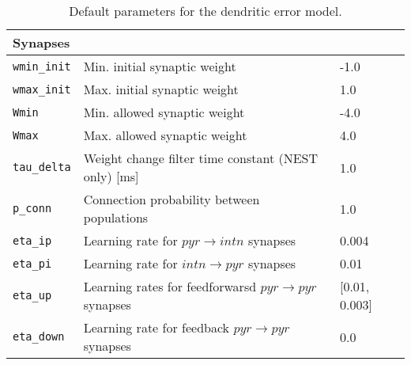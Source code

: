 \begin{table}
\begin{center}
\begin{tabular}{p{}p{}p{}}
      \\
      \textbf{Synapses}
      \\\hline
      \texttt{wmin\_init}          & Min. initial synaptic weight                                                & -1.0
      \\
      \texttt{wmax\_init}          & Max. initial synaptic weight                                                & 1.0
      \\
      \texttt{Wmin}                & Min. allowed synaptic weight                                                & -4.0
      \\
      \texttt{Wmax}                & Max. allowed synaptic weight                                                & 4.0
      \\
      \texttt{tau\_delta}          & Weight change filter time constant (NEST only) [ms]                         & 1.0
      \\

      \texttt{p\_conn}             & Connection probability between populations                                  & 1.0
      \\
      \texttt{eta\_ip}             & Learning rate for $pyr\rightarrow intn$ synapses                            & 0.004
      \\
      \texttt{eta\_pi}             & Learning rate for $intn\rightarrow pyr$ synapses                            & 0.01
      \\
      \texttt{eta\_up}             & Learning rates for feedforwarsd $pyr\rightarrow pyr$ synapses               &
      [0.01, 0.003]                                                                                                      \\
      \texttt{eta\_down}           & Learning rate for feedback $pyr\rightarrow pyr$ synapses                    & 0.0
      \\
    \end{tabular}\caption{Default parameters for the dendritic error model. }\label{tab-params}
  \end{center}
\end{table}
